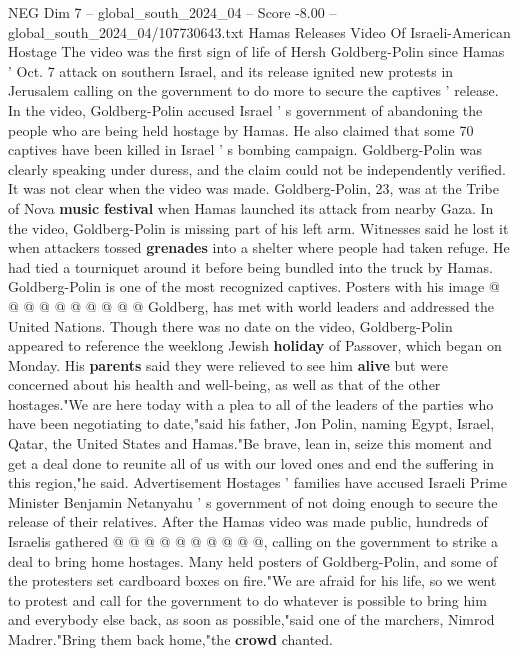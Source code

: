 \begin{textsample}{NEG Dim 7 – global\_south\_2024\_04 – Score -8.00 – global\_south\_2024\_04/107730643.txt}  \label{ex:f7_neg_342}
Hamas Releases Video Of Israeli-American Hostage The video was the first sign of life of Hersh Goldberg-Polin since Hamas ' Oct. 7 attack on southern Israel, and its release ignited new protests in Jerusalem calling on the government to do more to secure the captives ' release.
In the video, Goldberg-Polin accused Israel ' s government of abandoning the people who are being held hostage by Hamas.
He also claimed that some 70 captives have been killed in Israel ' s bombing campaign.
Goldberg-Polin was clearly speaking under duress, and the claim could not be independently verified.
It was not clear when the video was made.
Goldberg-Polin, 23, was at the Tribe of Nova \textbf{music} \textbf{festival} when Hamas launched its attack from nearby Gaza.
In the video, Goldberg-Polin is missing part of his left arm.
Witnesses said he lost it when attackers tossed \textbf{grenades} into a shelter where people had taken refuge.
He had tied a tourniquet around it before being bundled into the truck by Hamas.
Goldberg-Polin is one of the most recognized captives.
Posters with his image @ @ @ @ @ @ @ @ @ @ Goldberg, has met with world leaders and addressed the United Nations.
Though there was no date on the video, Goldberg-Polin appeared to reference the weeklong Jewish \textbf{holiday} of Passover, which began on Monday.
His \textbf{parents} said they were relieved to see him \textbf{alive} but were concerned about his health and well-being, as well as that of the other hostages."We are here today with a plea to all of the leaders of the parties who have been negotiating to date,"said his father, Jon Polin, naming Egypt, Israel, Qatar, the United States and Hamas."Be brave, lean in, seize this moment and get a deal done to reunite all of us with our loved ones and end the suffering in this region,"he said.
Advertisement Hostages ' families have accused Israeli Prime Minister Benjamin Netanyahu ' s government of not doing enough to secure the release of their relatives.
After the Hamas video was made public, hundreds of Israelis gathered @ @ @ @ @ @ @ @ @ @, calling on the government to strike a deal to bring home hostages.
Many held posters of Goldberg-Polin, and some of the protesters set cardboard boxes on fire."We are afraid for his life, so we went to protest and call for the government to do whatever is possible to bring him and everybody else back, as soon as possible,"said one of the marchers, Nimrod Madrer."Bring them back home,"the \textbf{crowd} chanted.

\end{textsample}
